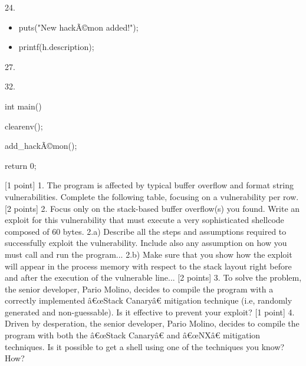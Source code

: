\documentclass{article}
\begin{document}
24.
\begin{itemize}
    \item[\textbf{25.}] puts("New hackÃ©mon added!");
    \item[\textbf{26.}] printf(h.description);
\end{itemize}
27.
\begin{itemize}
    \item[\textbf{28.}] // TODO: add the hackÃ©mon to the hackedex
    \item[\textbf{29.}] h.hack\_index--;
    \item[\textbf{30.}] }
    \item[\textbf{31.}] }
\end{itemize}
32.
\begin{itemize}
    \item[\textbf{33.}] int main(){
    \item[\textbf{34.}] clearenv();
    \item[\textbf{35.}] add\_hackÃ©mon();
    \item[\textbf{36.}] return 0;
    \item[\textbf{37.}] }

\end{itemize}
[1 point] 1. The program is affected by typical buffer overflow and format string vulnerabilities. Complete the following table, focusing on a vulnerability per row.
[2 points] 2. Focus only on the stack-based buffer overflow(s) you found. Write an exploit for this vulnerability that must execute a very sophisticated shellcode composed of 60 bytes.
2.a) Describe all the steps and assumptions required to successfully exploit the vulnerability. Include also any assumption on how you must call and run the program...
2.b) Make sure that you show how the exploit will appear in the process memory with respect to the stack layout right before and after the execution of the vulnerable line...
[2 points] 3. To solve the problem, the senior developer, Pario Molino, decides to compile the program with a correctly implemented â€œStack Canaryâ€ mitigation technique (i.e, randomly generated and non-guessable). Is it effective to prevent your exploit?
[1 point] 4. Driven by desperation, the senior developer, Pario Molino, decides to compile the program with both the â€œStack Canaryâ€ and â€œNXâ€ mitigation techniques. Is it possible to get a shell using one of the techniques you know? How?
\end{document}
